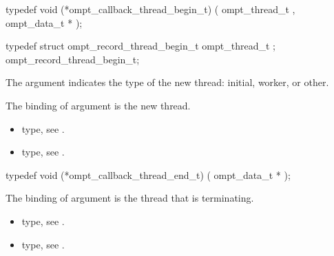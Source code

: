 \begin{ccppspecific}
\begin{omptCallback}
typedef void (*ompt_callback_thread_begin_t) (
  ompt_thread_t ,
  ompt_data_t *
);
\end{omptCallback}
\end{ccppspecific}


\record

\begin{ccppspecific}
\begin{omptRecord}
typedef struct ompt_record_thread_begin_t {
  ompt_thread_t ;
} ompt_record_thread_begin_t;
\end{omptRecord}
\end{ccppspecific}


\argdesc

The argument 
indicates the type of the new thread: initial, worker, or other.

The binding of argument  is the new thread.

\crossreferences
\begin{itemize}
\item {} type, see
.
\item {} type, see
.
\end{itemize}



\label{sec:ompt_callback_thread_end_t}
\format

\begin{ccppspecific}
\begin{omptCallback}
typedef void (*ompt_callback_thread_end_t) (
  ompt_data_t *
);
\end{omptCallback}
\end{ccppspecific}


\argdesc

The binding of argument  is the thread that is
terminating.

\crossreferences
\begin{itemize}
\item {} type, see
.
\item {} type, see
.
\end{itemize}


